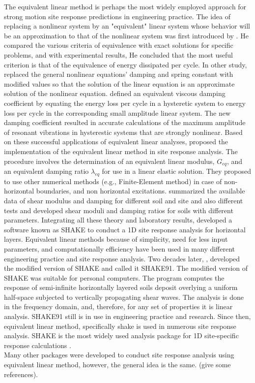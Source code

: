 The equivalent linear method is perhaps the most widely employed approach for strong motion site response predictions in engineering practice\citep{Assimaki2008quantifying}. The idea of replacing a nonlinear system by an "equivalent" linear system whose behavior will be an approximation to that of the nonlinear system was first introduced by \citet{jacobsen1930steady}. He compared the various criteria of equivalence with exact solutions for specific problems,  and with experimental results, He concluded that the most useful criterion is that of the equivalence of energy dissipated per cycle. In other study, \citet{Kryloff1943} replaced the general nonlinear equations' damping and spring constant with modified values so that the solution of the linear equation is an approximate solution of the nonlinear equation. \citet{Hudson1965}  defined an equivalent viscous damping coefficient by equating the energy loss per cycle in a hysteretic system to energy loss per cycle in the corresponding small amplitude linear system. The new damping coefficient resulted in accurate calculations of the maximum amplitude of resonant vibrations in hysterestic systems that are strongly nonlinear.  Based on these successful applications of equivalent linear analyses, \citet{Idriss1968} proposed the implementation of the equivalent linear method in site response analysis. The procedure involves the determination of an equivalent linear modulus, $G_{eq}$, and an equivalent damping ratio $\lambda_{eq}$ for use in a linear elastic solution. They proposed to use other numerical methods (e.g., Finite-Element method) in case of  non-horizontal boundaries, and non horizontal excitations. \citet{Idriss1970} summarized the available data of shear modulus and damping for different soil and site and also different tests  and  developed  shear moduli and damping ratios for soils with different parameters. Integrating all these theory and laboratory results,  \citet{Schnabel1972a} developed a software known as SHAKE to conduct a 1D site response analysis for horizontal layers. Equivalent linear methods because of simplicity, need for less input parameters, and computationally efficiency have been used in many different engineering practice and site response analysis. Two decades later, \citet{Idriss1992}, developed the modified version of SHAKE and called it SHAKE91. The modified version of SHAKE was suitable for personal computers. The program computes the response of  semi-infinite horizontally layered soils deposit overlying a uniform half-space subjected to vertically propagating shear waves. The analysis is done in the frequency domain, and, therefore, for any set of properties it is linear analysis. SHAKE91 still is in use in engineering practice and research. Since then, equivalent linear method, specifically shake is used in numerous site response analysis. SHAKE is the most widely used analysis package for 1D site-specific response calculations \citet{Assimaki2008quantifying}. \\
Many other packages were developed to conduct site response analysis using equivalent linear method, however, the general idea is the same. (give some references).


